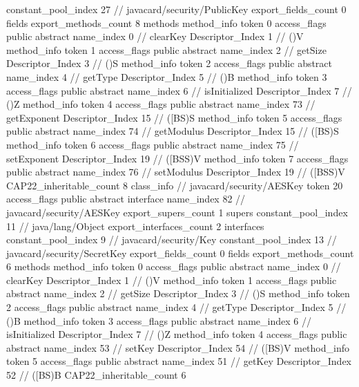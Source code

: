 {{{{				constant_pool_index	27		// javacard/security/PublicKey
			}
			export_fields_count	0
			fields {
			}
			export_methods_count	8
			methods {
				method_info {
					token	0
					access_flags	public abstract
					name_index	0		// clearKey
					Descriptor_Index	1		// ()V
				}
				method_info {
					token	1
					access_flags	public abstract
					name_index	2		// getSize
					Descriptor_Index	3		// ()S
				}
				method_info {
					token	2
					access_flags	public abstract
					name_index	4		// getType
					Descriptor_Index	5		// ()B
				}
				method_info {
					token	3
					access_flags	public abstract
					name_index	6		// isInitialized
					Descriptor_Index	7		// ()Z
				}
				method_info {
					token	4
					access_flags	public abstract
					name_index	73		// getExponent
					Descriptor_Index	15		// ([BS)S
				}
				method_info {
					token	5
					access_flags	public abstract
					name_index	74		// getModulus
					Descriptor_Index	15		// ([BS)S
				}
				method_info {
					token	6
					access_flags	public abstract
					name_index	75		// setExponent
					Descriptor_Index	19		// ([BSS)V
				}
				method_info {
					token	7
					access_flags	public abstract
					name_index	76		// setModulus
					Descriptor_Index	19		// ([BSS)V
				}
			}
			CAP22_inheritable_count	8
		}
		class_info {		// javacard/security/AESKey
			token	20
			access_flags	public abstract interface
			name_index	82		// javacard/security/AESKey
			export_supers_count	1
			supers {
				constant_pool_index	11		// java/lang/Object
			}
			export_interfaces_count	2
			interfaces {
				constant_pool_index	9		// javacard/security/Key
				constant_pool_index	13		// javacard/security/SecretKey
			}
			export_fields_count	0
			fields {
			}
			export_methods_count	6
			methods {
				method_info {
					token	0
					access_flags	public abstract
					name_index	0		// clearKey
					Descriptor_Index	1		// ()V
				}
				method_info {
					token	1
					access_flags	public abstract
					name_index	2		// getSize
					Descriptor_Index	3		// ()S
				}
				method_info {
					token	2
					access_flags	public abstract
					name_index	4		// getType
					Descriptor_Index	5		// ()B
				}
				method_info {
					token	3
					access_flags	public abstract
					name_index	6		// isInitialized
					Descriptor_Index	7		// ()Z
				}
				method_info {
					token	4
					access_flags	public abstract
					name_index	53		// setKey
					Descriptor_Index	54		// ([BS)V
				}
				method_info {
					token	5
					access_flags	public abstract
					name_index	51		// getKey
					Descriptor_Index	52		// ([BS)B
				}
			}
			CAP22_inheritable_count	6
}}}
